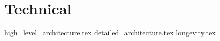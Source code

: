\chapter{Technical}
\label{chap:technical}

{high_level_architecture.tex}
{detailed_architecture.tex}
{longevity.tex}
